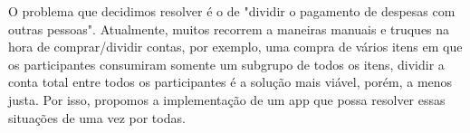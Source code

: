 O problema que decidimos resolver é o de "dividir o pagamento de despesas com outras pessoas". Atualmente, muitos recorrem a maneiras manuais e truques na hora de comprar/dividir contas, por exemplo, uma compra de vários itens em que os participantes consumiram somente um subgrupo de todos os itens, dividir a conta total entre todos os participantes é a solução mais viável, porém, a menos justa. Por isso, propomos a implementação de um app que possa resolver essas situações de uma vez por todas.